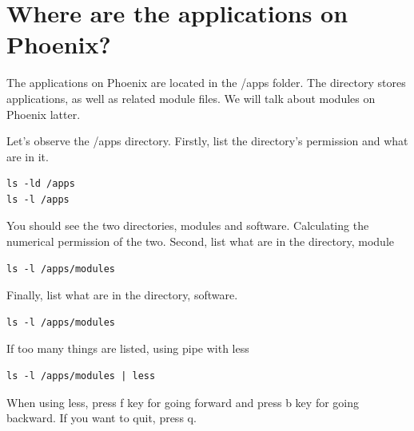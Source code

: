 \section{Where are the applications on Phoenix?}


The applications on Phoenix are located in the /apps folder. The directory stores applications, as well as related module files. We will talk about modules on Phoenix latter.\\


\begin{steps}
Let's observe the /apps directory. Firstly, list the directory's permission and what are in it.
\begin{lstlisting}
ls -ld /apps
ls -l /apps
\end{lstlisting}
You should see the two directories, modules and software. Calculating the numerical permission of the two.
Second, list what are in the directory, module
\begin{lstlisting}
ls -l /apps/modules
\end{lstlisting}
Finally, list what are in the directory, software. 
\begin{lstlisting}
ls -l /apps/modules
\end{lstlisting}
If too many things are listed, using pipe with less
\begin{lstlisting}
ls -l /apps/modules | less
\end{lstlisting}
When using less, press f key for going forward and press b key for going backward. If you want to quit, press q.
\end{steps}

